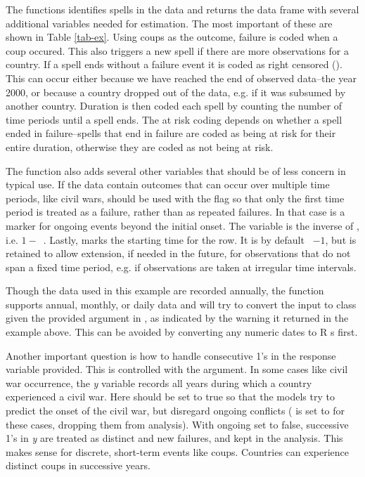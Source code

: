 The  functions identifies spells in the data and
returns the data frame with several additional variables needed for
estimation. The most important of these are shown in Table \ref{tab-ex}. Using coups as the outcome, failure is coded when a coup occured. This also triggers a new spell if there are more observations for a country. If a spell ends without a failure event it is coded as right censored (). This can occur either because we have reached the end of observed data--the year 2000, or because a country dropped out of the data, e.g. if it was subsumed by another country. Duration is then coded each spell by counting the number of time periods until a spell ends. The at risk coding depends on whether a spell ended in failure--spells that end in failure are coded as being at risk for their entire duration, otherwise they are coded as not being at risk. 

The  function also adds several other variables that should be of less concern in typical use. If the data contain outcomes that can occur over multiple time periods, like civil wars,  should be used with the  flag so that only the first time period is treated as a failure, rather than as repeated failures. In that case  is a marker for ongoing events beyond the initial onset. The variable  is the inverse of , i.e. $1 -$~. Lastly,  marks the starting time for the row. It is by default ~$ - 1$, but is retained to allow extension, if needed in the future, for observations that do not span a fixed time period, e.g. if observations are taken at irregular time intervals. 

Though the data used in this example are recorded annually, the function
supports annual, monthly, or daily data and will try to convert the
 input to class  given the provided argument in
, as indicated by the warning it returned in the example above. This 
can be avoided by converting any numeric dates to {\sf R} s first.

Another important question is how to handle consecutive 1's
in the response variable provided. This is controlled with the
 argument. In some cases like civil war occurrence, the
\emph{y} variable records all years during which a country experienced a
civil war. Here  should be set to true so that the models
try to predict the onset of the civil war, but disregard ongoing
conflicts ( is set to  for these cases, dropping
them from analysis). With ongoing set to false, successive 1's in
\emph{y} are treated as distinct and new failures, and kept in the
analysis. This makes sense for discrete, short-term events like coups.
Countries can experience distinct coups in successive years.

